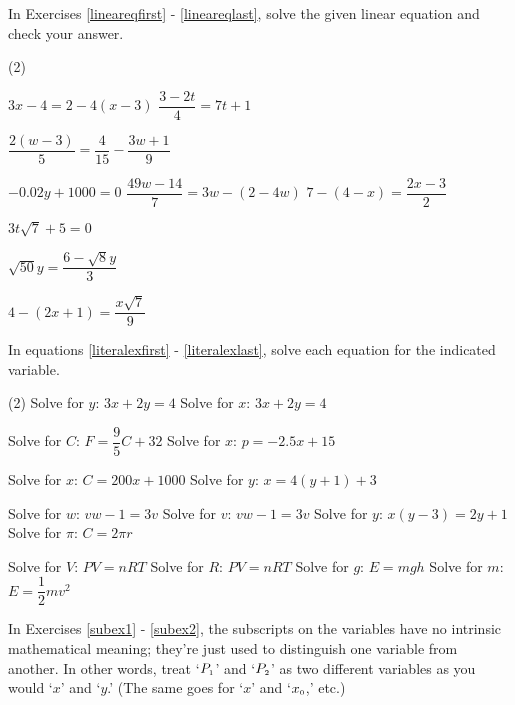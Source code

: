 \label{ExercisesforAppLinearEqIneq}

In Exercises \ref{lineareqfirst} - \ref{lineareqlast}, solve the given linear equation and check your answer.  

\begin{tasks}(2)

\task $3x - 4 = 2 - 4(x-3)$\label{lineareqfirst} 
\task $\dfrac{3 - 2t}{4} = 7t+1$

\task  $\dfrac{2(w-3)}{5} = \dfrac{4}{15} - \dfrac{3w+1}{9}$ 

\task  $-0.02y + 1000 = 0$  
\task  $\dfrac{49w - 14}{7}= 3w - (2-4w)$ 
\task  $7 - (4-x) = \dfrac{2x-3}{2}$  

\task $3 t\sqrt{7}  + 5 = 0$  

\task  $\sqrt{50} y = \dfrac{6 - \sqrt{8} y}{3}$  

\task  $4 - (2x+1) = \dfrac{x \sqrt{7}}{9}$ \label{lineareqlast} 
\end{tasks}

In equations \ref{literalexfirst} - \ref{literalexlast}, solve each equation for the indicated variable.

\begin{tasks}[resume](2)
\task  Solve for $y$:  $3x+2y = 4$  \label{literalexfirst}
\task  Solve for $x$:  $3x+2y = 4$ 

\task  Solve for $C$: $F = \dfrac{9}{5} C + 32$
\task  Solve for $x$:  $p = -2.5x + 15$ 

\task  Solve for $x$: $C = 200x + 1000$ 
\task  Solve for $y$:  $x= 4(y+1) + 3$ 

\task  Solve for $w$:  $vw - 1 = 3v$ 
\task  Solve for $v$:   $vw - 1 = 3v$
\task Solve for $y$:  $x(y-3) = 2y+1$
\task Solve for $\pi$:  $C = 2\pi r$

\task Solve for $V$:   $PV = nRT$
\task Solve for $R$:  $PV = nRT$
\task Solve for $g$:   $E = mgh$ 
\task Solve for $m$:  $E = \dfrac{1}{2} mv^2$
\end{tasks}

In Exercises \ref{subex1} - \ref{subex2}, the subscripts on the variables have no intrinsic mathematical meaning; they're just used to distinguish one variable from another.  In other words, treat `$P_{\text{\tiny $1$}}$' and `$P_{\text{\tiny $2$}}$'  as two different variables as you would `$x$' and `$y$.'  (The same goes for `$x$' and `$x_{\text{\tiny $0$}}$,'  etc.)

